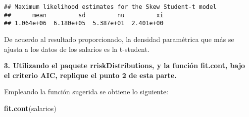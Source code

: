 \documentclass[
]{article}
\newenvironment{Shaded}{\begin{snugshade}}{\end{snugshade}}
\newcommand{\FunctionTok}[1]{\textcolor[rgb]{0.13,0.29,0.53}{\textbf{#1}}}
\newcommand{\NormalTok}[1]{#1}
\begin{document}
\begin{verbatim}
## Maximum likelihood estimates for the Skew Student-t model 
##      mean         sd         nu         xi  
## 1.064e+06  6.180e+05  5.387e+01  2.401e+00
\end{verbatim}

De acuerdo al resultado proporcionado, la densidad paramétrica que más
se ajusta a los datos de los salarios es la t-student.

\textbf{3. Utilizando el paquete rriskDistributions, y la función
fit.cont, bajo el criterio AIC, replique el punto 2 de esta parte.}

Empleando la función sugerida se obtiene lo siguiente:

\begin{Shaded}
\begin{Highlighting}[]
\FunctionTok{fit.cont}\NormalTok{(salarios)}
\end{Highlighting}
\end{Shaded}
\end{document}
